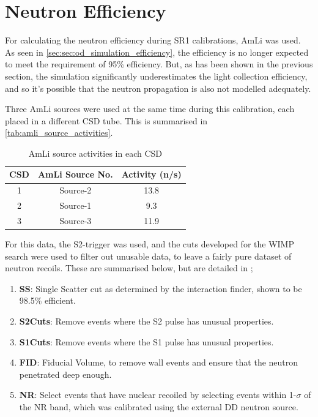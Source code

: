 \section{Neutron Efficiency}
\par
For calculating the neutron efficiency during SR1 calibrations, AmLi was used.
As seen in \autoref{sec:sec:od_simulation_efficiency}, the efficiency is no longer expected to meet the requirement of 95\% efficiency.
But, as has been shown in the previous section, the simulation significantly underestimates the light collection efficiency, and so it's possible that the neutron propagation is also not modelled adequately.

\par
Three AmLi sources were used at the same time during this calibration, each placed in a different CSD tube.
This is summarised in \autoref{tab:amli_source_activities}.

\begin{table}[!htbp]
    \centering
    \begin{tabular}{c|c|c}
        CSD & AmLi Source No. & Activity (n/s) \\ \hline
        1   & Source-2        & 13.8           \\
        2   & Source-1        & 9.3            \\ 
        3   & Source-3        & 11.9                
    \end{tabular}
    \caption{AmLi source activities in each CSD}
    \label{tab:amli_source_activities}
\end{table}

\par
For this data, the S2-trigger was used, and the cuts developed for the WIMP search were used to filter out unusable data, to leave a fairly pure dataset of neutron recoils.
These are summarised below, but are detailed in \cite{lz_ws_sr1_ref};

\begin{enumerate}
    \item \textbf{SS}: Single Scatter cut as determined by the interaction finder, shown to be 98.5\% efficient.
    \item \textbf{S2Cuts}: Remove events where the S2 pulse has unusual properties.
    \item \textbf{S1Cuts}: Remove events where the S1 pulse has unusual properties.
    \item \textbf{FID}: Fiducial Volume, to remove wall events and ensure that the neutron penetrated deep enough.
    \item \textbf{NR}: Select events that have nuclear recoiled by selecting events within 1-$\sigma$ of the NR band, which was calibrated using the external DD neutron source.
\end{enumerate}

